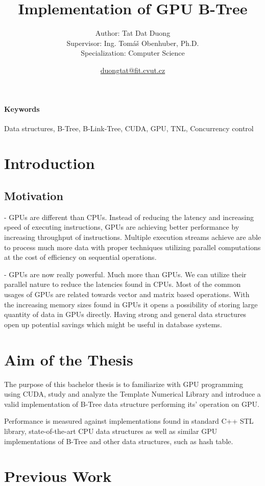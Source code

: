 \documentclass{article}
\title{Implementation of GPU B-Tree} %
\author{
    \small Author: Tat Dat Duong\\
    \small Supervisor: Ing. Tomáš Obenhuber, Ph.D.\\
    \small Specialization: Computer Science
} %
\date{\small \url{duongtat@fit.cvut.cz}}
\begin{document}
\maketitle

\paragraph{Keywords}{Data structures, B-Tree, B-Link-Tree, CUDA, GPU, TNL, Concurrency control}

\section{Introduction}
\subsection{Motivation}

- GPUs are different than CPUs. Instead of reducing the latency and increasing speed of executing instructions, GPUs are achieving better performance by increasing throughput of instructions. Multiple execution streams achieve are able to process much more data with proper techniques utilizing parallel computations at the cost of efficiency on sequential operations.

- GPUs are now really powerful. Much more than GPUs. We can utilize their parallel nature to reduce the latencies found in CPUs. Most of the common usages of GPUs are related towards vector and matrix based operations. With the increasing memory sizes found in GPUs it opens a possibility of storing large quantity of data in GPUs directly. Having strong and general data structures open up potential savings which might be useful in database systems.


\section{Aim of the Thesis}
The purpose of this bachelor thesis is to familiarize with GPU programming using CUDA, study and analyze the Template Numerical Library and introduce a valid implementation of B-Tree data structure performing its' operation on GPU.

Performance is measured against implementations found in standard C++ STL library, state-of-the-art CPU data structures as well as similar GPU implementations of B-Tree and other data structures, such as hash table.

\section{Previous Work}
\end{document}
